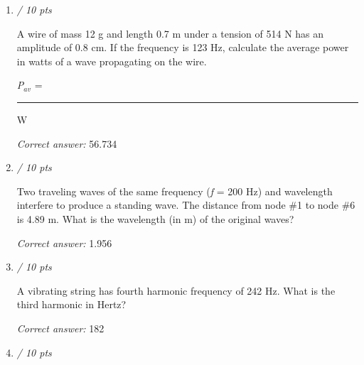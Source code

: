 \documentclass[11pt]{article}
\begin{document}
\begin{enumerate}[leftmargin=*,label=\textbf{Question \arabic*.}]
\begin{itemize}
  \item 0.477
  \item 8.25
  \item \textbf{[correct]} 12.6
  \item -2.1
  \item 5
\end{itemize}
\textit{Answer 8:}
\begin{itemize}
  \item 5
  \item \textbf{[correct]} 6.0
  \item 6.4
  \item 4.6
  \item 5.7
\end{itemize}
\textit{Answer 9:}
\begin{itemize}
  \item \textbf{[correct]} 12.9
  \item 13.7
  \item 6.01
  \item -6.83
  \item -8.73
\end{itemize}

\item \hfill \textit{/ 10 pts}

A wire of mass 12 g and length 0.7 m under a tension of 514 N has an amplitude of 0.8 cm. If the frequency is 123 Hz, calculate the average power in watts of a wave propagating on the wire.



\emph{P}$_{av}$ = \rule{2cm}{0.4pt} W

\textit{Correct answer: } 56.734

\item \hfill \textit{/ 10 pts}

Two traveling waves of the same frequency (\emph{f} = 200 Hz) and wavelength interfere to produce a standing wave. The distance from node \#1 to node \#6 is 4.89 m. What is the wavelength (in m) of the original waves?

\textit{Correct answer: } 1.956

\item \hfill \textit{/ 10 pts}

A vibrating string has fourth harmonic frequency of 242 Hz. What is the third harmonic in Hertz?

\textit{Correct answer: } 182

\item \hfill \textit{/ 10 pts}


\end{enumerate}
\end{document}
